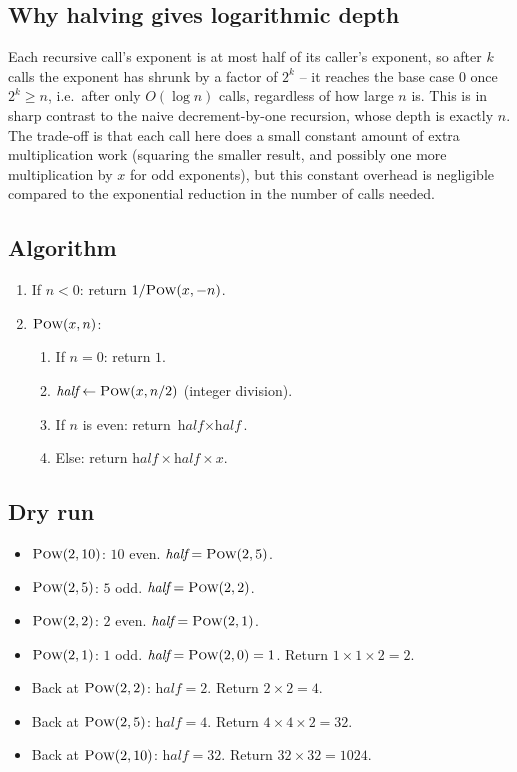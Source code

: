 \subsection*{Why halving gives logarithmic depth}

Each recursive call's exponent is at most half of its caller's exponent,
so after $k$ calls the exponent has shrunk by a factor of $2^k$ -- it
reaches the base case $0$ once $2^k \ge n$, i.e.\ after only
$O(\log n)$ calls, regardless of how large $n$ is. This is in sharp
contrast to the naive decrement-by-one recursion, whose depth is exactly
$n$. The trade-off is that each call here does a small constant amount
of extra multiplication work (squaring the smaller result, and possibly
one more multiplication by $x$ for odd exponents), but this constant
overhead is negligible compared to the exponential reduction in the
number of calls needed.

\subsection*{Algorithm}

\begin{enumerate}
  \item If $n<0$: return $1 / \textsc{Pow}(x, -n)$.
  \item $\textsc{Pow}(x, n)$:
  \begin{enumerate}
    \item If $n=0$: return $1$.
    \item $\textit{half} \gets \textsc{Pow}(x, n/2)$ (integer division).
    \item If $n$ is even: return $\textit{half} \times \textit{half}$.
    \item Else: return $\textit{half} \times \textit{half} \times x$.
  \end{enumerate}
\end{enumerate}

\subsection*{Dry run}


\begin{itemize}
  \item $\textsc{Pow}(2,10)$: $10$ even. $\textit{half}=\textsc{Pow}(2,5)$.
  \item $\textsc{Pow}(2,5)$: $5$ odd. $\textit{half}=\textsc{Pow}(2,2)$.
  \item $\textsc{Pow}(2,2)$: $2$ even. $\textit{half}=\textsc{Pow}(2,1)$.
  \item $\textsc{Pow}(2,1)$: $1$ odd. $\textit{half}=\textsc{Pow}(2,0)=1$.
        Return $1\times1\times2=2$.
  \item Back at $\textsc{Pow}(2,2)$: $\textit{half}=2$. Return
        $2\times2=4$.
  \item Back at $\textsc{Pow}(2,5)$: $\textit{half}=4$. Return
        $4\times4\times2=32$.
  \item Back at $\textsc{Pow}(2,10)$: $\textit{half}=32$. Return
        $32\times32=1024$.
\end{itemize}


